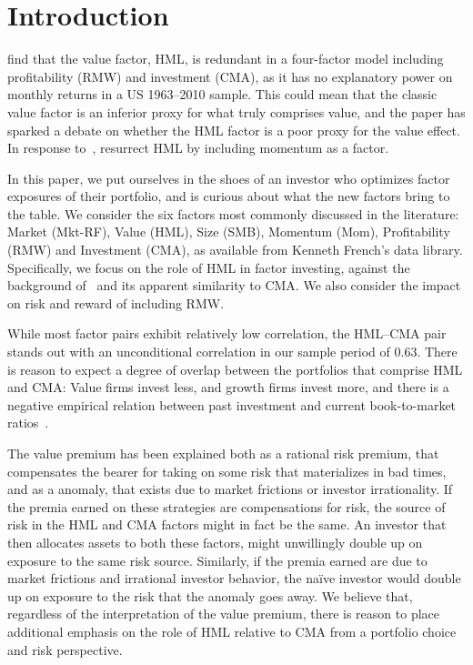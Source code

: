 \section{Introduction}
\textcite{FF2015} find that the value factor, HML, is redundant in a four-factor model including profitability (RMW) and investment (CMA), as it has no explanatory power on monthly returns in a US 1963–2010 sample. This could mean that the classic value factor is an inferior proxy for what truly comprises value, and the paper has sparked a debate on whether the HML factor is a poor proxy for the value effect. In response to~\textcite{FF2015}, \textcite{Asness2015} resurrect HML by including momentum as a factor.

In this paper, we put ourselves in the shoes of an investor who optimizes factor exposures of their portfolio, and is curious about what the new factors bring to the table. We consider the six factors most commonly discussed in the literature: Market (Mkt-RF), Value (HML), Size (SMB), Momentum (Mom), Profitability (RMW) and Investment (CMA), as available from Kenneth French's data library. Specifically, we focus on the role of HML in factor investing, against the background of~\textcite{FF2015,Asness2015} and its apparent similarity to CMA. We also consider the impact on risk and reward of including RMW.

While most factor pairs exhibit relatively low correlation, the HML--CMA pair stands out with an unconditional correlation in our sample period of 0.63. There is reason to expect a degree of overlap between the portfolios that comprise HML and CMA: Value firms invest less, and growth firms invest more, and there is a negative empirical relation between past investment and current book-to-market ratios~\autocite{Zhang2005,AndersonGarciaFeijoo2006}.

The value premium has been explained both as a rational risk premium, that compensates the bearer for taking on some risk that materializes in bad times, and as a anomaly, that exists due to market frictions or investor irrationality. If the premia earned on these strategies are compensations for risk, the source of risk in the HML and CMA factors might in fact be the same. An investor that then allocates assets to both these factors, might unwillingly double up on exposure to the same risk source. Similarly, if the premia earned are due to market frictions and irrational investor behavior, the naïve investor would double up on exposure to the risk that the anomaly goes away. We believe that, regardless of the interpretation of the value premium, there is reason to place additional emphasis on the role of HML relative to CMA from a portfolio choice and risk perspective.

